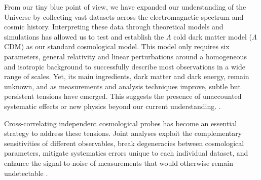 \documentclass[]{aa} %
\begin{document}
From our tiny blue point of view, we have expanded our understanding of the Universe by collecting vast datasets across the electromagnetic spectrum and cosmic history. Interpreting these data through theoretical models and simulations has allowed us to test and establish the $\Lambda$ cold dark matter model ($\Lambda$CDM) as our standard cosmological model. This model only requires six parameters, general relativity and linear perturbations around a homogeneous and isotropic background to successfully describe most observations in a wide range of scales. Yet, its main ingredients, dark matter and dark energy, remain unknown, and as measurements and analysis techniques improve, subtle but persistent tensions have emerged. This suggests the presence of unaccounted systematic effects or new physics beyond our current understanding. \citep{LCDMtensionsreview_2022jun_abdalla,LCDMtensionsreview_2022dec_perivolaropoulos,LCDMtensionsreview_2022dec_peebles,LCDMtensionsreview_2025feb_efstathiou}. 

Cross-correlating independent cosmological probes has become an essential strategy to address these tensions. Joint analyses exploit the complementary sensitivities of different observables, break degeneracies between cosmological parameters, mitigate systematics errors unique to each individual dataset, and enhance the signal-to-noise of measurements that would otherwise remain undetectable \citep{potentialofCMBxLSS_2008aug_ho,potentialofCMBxLSS_2008aug_hirata,potentialofCMBxLSS_2014feb_pearson,potentialofCMBxLSS_2016oct_nicola,potentialofCMBxLSS_DESjan23_omori,potentialofCMBxLSS_DESjan23_chang,potentialofCMBxLSS_DESjan23_abbot}.
\end{document}

